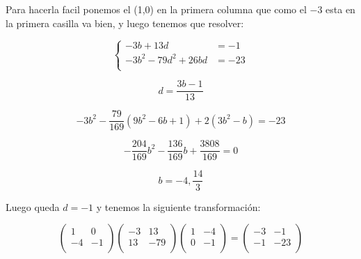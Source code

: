 \documentclass[12pt]{amsart}
\newcommand{\lp}{\left(}
\newcommand{\rp}{\right)}
\theoremstyle{plain}
\begin{document}
Para hacerla facil ponemos el (1,0) en la primera columna que
como el $-3$ esta en la primera casilla va bien, y luego 
tenemos que resolver:

$$\left\{
\begin{matrix}
    -3b+13d &=-1 \\
    -3b^2-79d^2+26bd &=-23 \\
\end{matrix}\right.$$

$$d=\frac{3b-1}{13}$$

$$-3b^2-\frac{79}{169}(9b^2-6b+1)+2(3b^2-b)=-23$$

$$-\frac{204}{169}b^2-\frac{136}{169}b+\frac{3808}{169}=0$$

$$b=-4, \frac{14}{3}$$

Luego queda $d=-1$ y tenemos la siguiente transformación:

$$\lp\begin{matrix}
    1&0 \\
    -4&-1 \\
\end{matrix}\rp
\lp\begin{matrix}
    -3&13 \\
    13&-79 \\
\end{matrix}\rp
\lp\begin{matrix}
    1&-4 \\
    0&-1 \\
\end{matrix}\rp = 
\lp\begin{matrix}
    -3&-1 \\
    -1&-23 \\
\end{matrix}\rp$$
\end{document}
